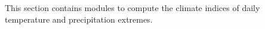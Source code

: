 This section contains modules to compute the climate indices
of daily temperature and precipitation extremes.

